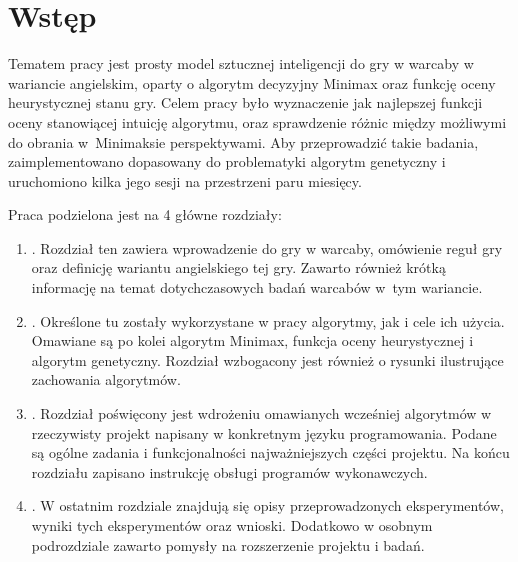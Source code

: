 \chapter*{Wstęp}

\thispagestyle{chapterBeginStyle}

Tematem pracy jest prosty model sztucznej inteligencji do gry w warcaby w wariancie angielskim, oparty o algorytm decyzyjny Minimax oraz funkcję oceny heurystycznej stanu gry. Celem pracy było wyznaczenie jak najlepszej funkcji oceny stanowiącej intuicję algorytmu, oraz sprawdzenie różnic między możliwymi do obrania w~Minimaksie perspektywami. Aby przeprowadzić takie badania, zaimplementowano dopasowany do problematyki algorytm genetyczny i uruchomiono kilka jego sesji na przestrzeni paru miesięcy. 

Praca podzielona jest na 4 główne rozdziały:

\begin{enumerate}
    \item {}. Rozdział ten zawiera wprowadzenie do gry w warcaby, omówienie reguł gry oraz definicję wariantu angielskiego tej gry. Zawarto również krótką informację na temat dotychczasowych badań warcabów w~tym wariancie.
    \item {}. Określone tu zostały wykorzystane w pracy algorytmy, jak i cele ich użycia. Omawiane są po kolei algorytm Minimax, funkcja oceny heurystycznej i algorytm genetyczny. Rozdział wzbogacony jest również o rysunki ilustrujące zachowania algorytmów.
    \item {}. Rozdział poświęcony jest wdrożeniu omawianych wcześniej algorytmów w rzeczywisty projekt napisany w konkretnym języku programowania. Podane są ogólne zadania i funkcjonalności najważniejszych części projektu. Na końcu rozdziału zapisano instrukcję obsługi programów wykonawczych.
    \item {}. W ostatnim rozdziale znajdują się opisy przeprowadzonych eksperymentów, wyniki tych eksperymentów oraz wnioski. Dodatkowo w osobnym podrozdziale zawarto pomysły na rozszerzenie projektu i badań.
\end{enumerate}


